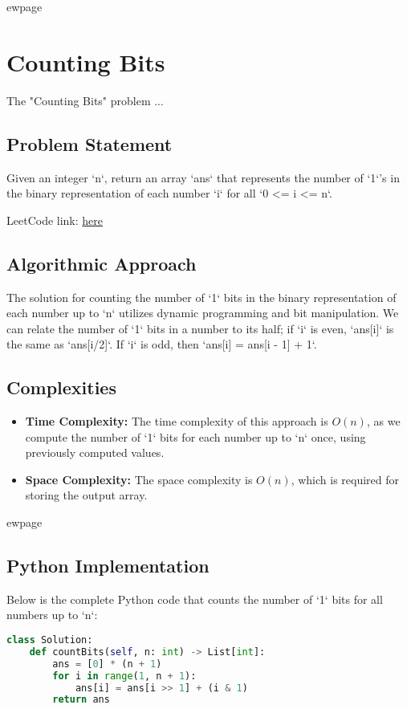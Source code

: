 
ewpage

\chapter{Counting Bits}
\label{chap:Counting_Bits}
The "Counting Bits" problem ...

\section*{Problem Statement}
Given an integer `n`, return an array `ans` that represents the number of `1`'s in the binary representation of each number `i` for all `0 <= i <= n`.

LeetCode link: \href{https://leetcode.com/problems/counting-bits/}{here}

\section*{Algorithmic Approach}
The solution for counting the number of `1` bits in the binary representation of each number up to `n` utilizes dynamic programming and bit manipulation. We can relate the number of `1` bits in a number to its half; if `i` is even, `ans[i]` is the same as `ans[i/2]`. If `i` is odd, then `ans[i] = ans[i - 1] + 1`.

\section*{Complexities}
\begin{itemize}
	\item \textbf{Time Complexity:} The time complexity of this approach is \(O(n)\), as we compute the number of `1` bits for each number up to `n` once, using previously computed values.
	\item \textbf{Space Complexity:} The space complexity is \(O(n)\), which is required for storing the output array.
\end{itemize}


ewpage %
\section*{Python Implementation}
Below is the complete Python code that counts the number of `1` bits for all numbers up to `n`:

\begin{fullwidth}
\begin{lstlisting}[language=Python]
class Solution:
    def countBits(self, n: int) -> List[int]:
        ans = [0] * (n + 1)
        for i in range(1, n + 1):
            ans[i] = ans[i >> 1] + (i & 1)
        return ans
\end{lstlisting}

\end{fullwidth}

